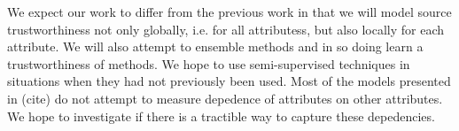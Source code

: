 \documentclass{acm_proc_article-sp}
\begin{document}
We expect our work to differ from the previous work in that we will model source trustworthiness not only globally, i.e. for all attributess, but also locally for each attribute. We will also attempt to ensemble methods and in so doing learn a trustworthiness of methods. We hope to use semi-supervised techniques in situations when they had not previously been used. Most of the models presented in (cite)  do not attempt to measure depedence of attributes on other attributes. We hope to investigate if there is a tractible way to capture these depedencies.



  

\balancecolumns
\end{document}
